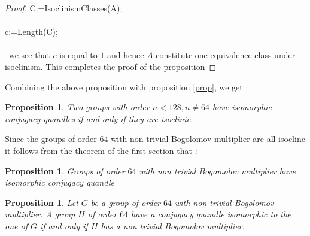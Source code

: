 \documentclass[12pt, reqno]{amsart}
\newtheorem{proposition}[theorem]{Proposition}
\begin{document}
\begin{proof}
C:=IsoclinismClasses(A);\\\\
c:=Length(C);\\\\\
we see that $c$ is equal to $1$ and hence $A$ constitute one equivalence class under isoclinism. This completes the proof of the proposition
\end{proof}
Combining the above proposition with proposition \ref{prop}, we get :
\begin{proposition}\label{prop2}
Two groups with order $n<128, n\neq 64$ have isomorphic conjugacy quandles if and only if they are isoclinic.
\end{proposition}
Since the groups of order $64$ with non trivial Bogolomov multiplier are all isoclinc it follows from the theorem of the first section that :
\begin{proposition}
Groups of order $64$ with non trivial Bogomolov multiplier have isomorphic conjugacy quandle
\end{proposition}
\begin{proposition}
Let $G$ be a group of order $64$ with non trivial Bogolomov multiplier. A group $H$ of order $64$ have a conjugacy quandle isomorphic to the one of $G$ if and only if $H$ has a non trivial Bogomolov multiplier. 
\end{proposition}
\end{document}
